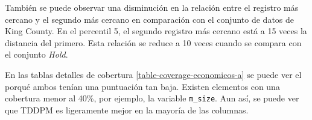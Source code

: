 



\newpage
También se puede observar una disminución en la relación entre el registro más cercano y el segundo más cercano en comparación con el conjunto de datos de King County. En el percentil 5, el segundo registro más cercano está a 15 veces la distancia del primero. Esta relación se reduce a 10 veces cuando se compara con el conjunto \emph{Hold}.




\newpage
En las tablas detalles de cobertura \ref{table-coverage-economicos-a} se puede ver el porqué ambos tenían una puntuación tan baja. Existen elementos con una cobertura menor al 40\%, por ejemplo, la variable \texttt{m\_size}. Aun así, se puede ver que TDDPM es ligeramente mejor en la mayoría de las columnas.

%


